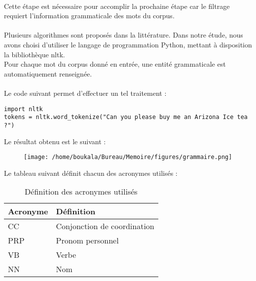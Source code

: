 \documentclass[12pt, a4paper, oneside]{book}
\begin{document}
\paragraph{}
Cette étape est nécessaire pour accomplir la prochaine étape car le filtrage requiert l'information grammaticale des mots du corpus.
\paragraph{}
Plusieurs algorithmes sont proposés dans la littérature\citep{sager}. Dans notre étude, nous avons choisi d'utiliser le langage de programmation Python, mettant à disposition la bibliothèque nltk.\\
Pour chaque mot du corpus donné en entrée, une entité grammaticale est automatiquement renseignée. \\ \\
Le code suivant permet d'effectuer un tel traitement : 
\begin{verbatim}
import nltk
tokens = nltk.word_tokenize("Can you please buy me an Arizona Ice tea ?")
\end{verbatim}

Le résultat obtenu est le suivant : 

\begin{figure}[h!]
\begin{center}
\texttt{[image: /home/boukala/Bureau/Memoire/figures/grammaire.png]}
\end{center}
\end{figure}

Le tableau suivant définit chacun des acronymes utilisés : 
\\

\begin{table}[h!]
\centering
\begin{tabular}{| l | l |}
 \hline
 Acronyme & Définition \\
 \hline
 CC & Conjonction de coordination \\
 \hline
 PRP & Pronom personnel \\
 \hline
 VB & Verbe \\
 \hline
 NN & Nom \\
 \hline
\end{tabular}
\caption{Définition des acronymes utilisés}
\end{table}
\end{document}
